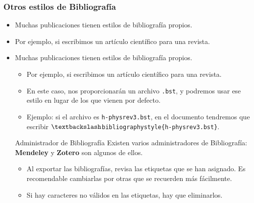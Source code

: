 \documentclass[aspectratio=43]{beamer}%
\begin{document}
\begin{frame}[fragile]
\frametitle{\textbf{Otros estilos de Bibliografía}}
\justifying
 \begin{itemize}\justifying
  \item Muchas publicaciones tienen estilos de bibliografía propios.
  \item Por ejemplo, si escribimos un artículo científico para una revista.
  \item Muchas publicaciones tienen estilos de bibliografía propios.
  \begin{itemize}\justifying
  \item Por ejemplo, si escribimos un artículo científico para una revista.
  \item En este caso, nos proporcionarán un archivo \texttt{.bst}, y podremos usar ese estilo en lugar de los que vienen por defecto.
  \item [] Ejemplo: si el archivo es \texttt{h-physrev3.bst}, en el documento tendremos que escribir \texttt{$\textbackslash$bibliographystyle\{h-physrev3.bst\}}.
\end{itemize}
\begin{block}{Administrador de Bibliografía}
Existen varios administradores de Bibliografía: \textbf{Mendeley} y \textbf{Zotero} son algunos de ellos.
\begin{itemize}\justifying
  \item Al exportar las bibliografías, revisa las etiquetas que se han asignado. Es recomendable cambiarlas por otras que se recuerden más fácilmente.
  \item Si hay caracteres no válidos en las etiquetas, hay que eliminarlos.
\end{itemize}
\end{block}
\end{itemize}
\end{frame}
\end{document}
